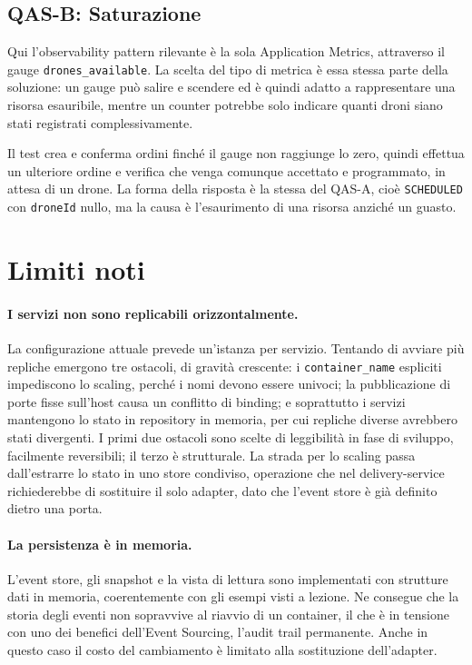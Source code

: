 \documentclass[12pt,a4paper]{article}
\begin{document}
\subsection{QAS-B: Saturazione}

Qui l'observability pattern rilevante \`e la sola Application Metrics, attraverso il gauge
\texttt{drones\_available}. La scelta del tipo di metrica \`e essa stessa parte della soluzione: un
gauge pu\`o salire e scendere ed \`e quindi adatto a rappresentare una risorsa esauribile, mentre un
counter potrebbe solo indicare quanti droni siano stati registrati complessivamente.

Il test crea e conferma ordini finch\'e il gauge non raggiunge lo zero, quindi effettua un ulteriore
ordine e verifica che venga comunque accettato e programmato, in attesa di un drone. La forma della
risposta \`e la stessa del QAS-A, cio\`e \texttt{SCHEDULED} con \texttt{droneId} nullo, ma la causa \`e
l'esaurimento di una risorsa anzich\'e un guasto.

\section{Limiti noti}
\label{sec:limiti}

\paragraph{I servizi non sono replicabili orizzontalmente.} La configurazione attuale prevede
un'istanza per servizio. Tentando di avviare pi\`u repliche emergono tre ostacoli, di gravit\`a
crescente: i \texttt{container\_name} espliciti impediscono lo scaling, perch\'e i nomi devono essere
univoci; la pubblicazione di porte fisse sull'host causa un conflitto di binding; e soprattutto i
servizi mantengono lo stato in repository in memoria, per cui repliche diverse avrebbero stati
divergenti. I primi due ostacoli sono scelte di leggibilit\`a in fase di sviluppo, facilmente
reversibili; il terzo \`e strutturale. La strada per lo scaling passa dall'estrarre lo stato in uno
store condiviso, operazione che nel delivery-service richiederebbe di sostituire il solo adapter, dato
che l'event store \`e gi\`a definito dietro una porta.

\paragraph{La persistenza \`e in memoria.} L'event store, gli snapshot e la vista di lettura sono
implementati con strutture dati in memoria, coerentemente con gli esempi visti a lezione. Ne consegue
che la storia degli eventi non sopravvive al riavvio di un container, il che \`e in tensione con uno
dei benefici dell'Event Sourcing, l'audit trail permanente. Anche in questo caso il costo del
cambiamento \`e limitato alla sostituzione dell'adapter.
\end{document}
